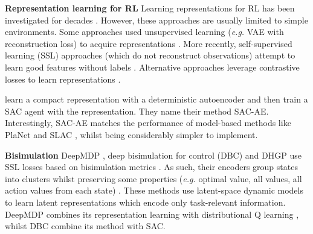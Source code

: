\documentclass{article}
\makeatletter
\theoremstyle{plain}
\theoremstyle{definition}
\theoremstyle{remark}
\newcommand{\eg}{\textit{e.g.\@}\xspace}
\makeatother
\begin{document}
\textbf{Representation learning for RL}
Learning representations for RL has been investigated for decades
\citep{abelOptimalBehaviorApproximate2016,mannorDynamicAbstractionReinforcement2004,liUnifiedTheoryState2006,andreStateAbstractionProgrammable2002,deardenAbstractionApproximateDecisiontheoretic1997,singhReinforcementLearningSoft1994,higginsDefinitionDisentangledRepresentations2018,vanhoofStableReinforcementLearning2016,watterEmbedControlLocally2015,ghoshRepresentationsStableOffPolicy2020}.
However, these approaches are usually limited to simple environments.
Some approaches used unsupervised learning (\eg VAE \citep{kingmaAutoEncoding2014} with reconstruction loss) to acquire representations
\cite{finnDeepSpatialAutoencoders2016,higginsDARLAImprovingZeroShot2017,langeAutonomousReinforcementLearning2012,watterEmbedControlLocally2015}.
More recently, self-supervised learning (SSL) approaches (which do not reconstruct observations)
attempt to learn good features without labels \cite{anandUnsupervisedStateRepresentation2019}.
Alternative approaches leverage contrastive losses to learn representations \cite{laskinCURLContrastiveUnsupervised2020}.

\citet{yaratsImprovingSampleEfficiency2021} learn a compact representation with a deterministic autoencoder and then train a
SAC agent \citep{haarnojaSoft2018} with the representation. They name their method SAC-AE.
Interestingly, SAC-AE matches the performance of model-based methods like PlaNet \citep{hafnerLearning2019}
and SLAC \citep{leeStochasticLatentActorCritic2020}, whilst being considerably simpler to implement.

\textbf{Bisimulation}
DeepMDP \citep{geladaDeepMDPLearningContinuous2019},
deep bisimulation for control (DBC) \citep{zhangLearningInvariantRepresentations2020}
and DHGP \citep{rezaei-shoshtariContinuousMDPHomomorphisms2022}
use SSL losses based on bisimulation metrics \citep{larsenBisimulationProbabilisticTesting1989}.
As such, their encoders group states into clusters whilst preserving some properties
(\eg optimal value, all values, all action values from each state) \citep{liUnifiedTheoryState2006}.
These methods use latent-space dynamic models to learn latent representations which encode only task-relevant information.
DeepMDP \citep{geladaDeepMDPLearningContinuous2019} combines its representation learning with
distributional Q learning  \citep[C51,][]{bellemareDistributionalPerspectiveReinforcement2017},
whilst DBC \citep{zhangLearningInvariantRepresentations2020} combine its method with SAC.
\end{document}
